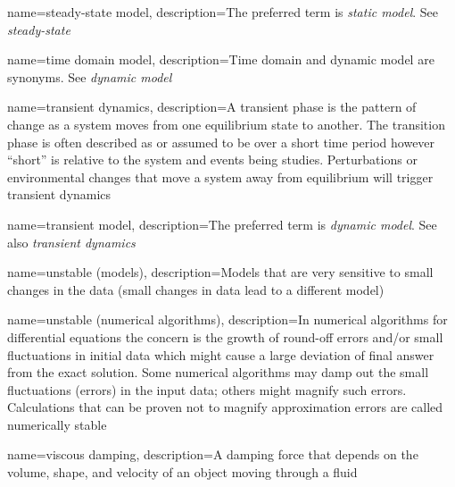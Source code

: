 {
	name=steady-state model,
	description=The preferred term is \textit{static model}.  See \emph{steady-state}
}


{
	name=time domain model,
	description=Time domain and dynamic model are synonyms.  See \emph{dynamic model}
}

{
	name=transient dynamics,
	description=A transient phase is the pattern of change as a system moves from one equilibrium state to another.  The transition phase is often described as\comma{} or assumed to be\comma{} over a short time period\comma{} however\comma{} ``short'' is relative to the system and events being studies.  Perturbations or environmental changes that move a system away from equilibrium will trigger transient dynamics
}

{
	name=transient model,
	description=The preferred term is \textit{dynamic model}.  See also \emph{transient dynamics}
}


{
    name=unstable (models),
    description=Models that are very sensitive to small changes in the data (small changes in data lead to a different model)
}

{
    name=unstable (numerical algorithms),
	description=In numerical algorithms for differential equations the concern is the growth of round-off errors and/or small fluctuations in initial data which might cause a large deviation of final answer from the exact solution.  Some numerical algorithms may damp out the small fluctuations (errors) in the input data; others might magnify such errors.  Calculations that can be proven not to magnify approximation errors are called numerically stable
}

{
	name=viscous damping,
	description={A damping force that depends on the volume, shape, and velocity of an object moving through a fluid}
}

